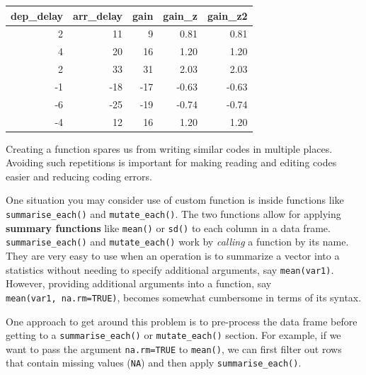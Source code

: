 \documentclass[]{book}
\newenvironment{Shaded}{\begin{snugshade}}{\end{snugshade}}
\newcommand{\KeywordTok}[1]{\textcolor[rgb]{0.13,0.29,0.53}{\textbf{{#1}}}}
\newcommand{\DataTypeTok}[1]{\textcolor[rgb]{0.13,0.29,0.53}{{#1}}}
\newcommand{\DecValTok}[1]{\textcolor[rgb]{0.00,0.00,0.81}{{#1}}}
\newcommand{\StringTok}[1]{\textcolor[rgb]{0.31,0.60,0.02}{{#1}}}
\newcommand{\CommentTok}[1]{\textcolor[rgb]{0.56,0.35,0.01}{\textit{{#1}}}}
\newcommand{\NormalTok}[1]{{#1}}
\theoremstyle{definition}
\theoremstyle{definition}
\theoremstyle{remark}
\begin{document}
\begin{tabular}{r|r|r|r|r}
\hline
dep\_delay & arr\_delay & gain & gain\_z & gain\_z2\\
\hline
2 & 11 & 9 & 0.81 & 0.81\\
\hline
4 & 20 & 16 & 1.20 & 1.20\\
\hline
2 & 33 & 31 & 2.03 & 2.03\\
\hline
-1 & -18 & -17 & -0.63 & -0.63\\
\hline
-6 & -25 & -19 & -0.74 & -0.74\\
\hline
-4 & 12 & 16 & 1.20 & 1.20\\
\hline
\end{tabular}

Creating a function spares us from writing similar codes in multiple
places. Avoiding such repetitions is important for making reading and
editing codes easier and reducing coding errors.

One situation you may consider use of custom function is inside
functions like \texttt{summarise\_each()} and \texttt{mutate\_each()}.
The two functions allow for applying \textbf{summary functions} like
\texttt{mean()} or \texttt{sd()} to each column in a data frame.
\texttt{summarise\_each()} and \texttt{mutate\_each()} work by
\emph{calling} a function by its name. They are very easy to use when an
operation is to summarize a vector into a statistics without needing to
specify additional arguments, say \texttt{mean(var1)}. However,
providing additional arguments into a function, say
\texttt{mean(var1,\ na.rm=TRUE)}, becomes somewhat cumbersome in terms
of its syntax.

One approach to get around this problem is to pre-process the data frame
before getting to a \texttt{summarise\_each()} or
\texttt{mutate\_each()} section. For example, if we want to pass the
argument \texttt{na.rm=TRUE} to \texttt{mean()}, we can first filter out
rows that contain missing values (\texttt{NA}) and then apply
\texttt{summarise\_each()}.

\begin{Shaded}
\end{Shaded}
\end{document}
